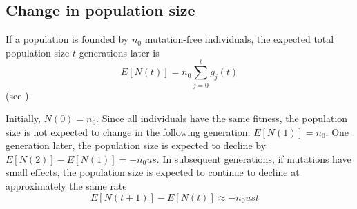\documentclass[9pt,lineno]{elife}
\begin{document}
\subsection*{Change in population size}


If a population is founded by $n_0$ mutation-free individuals, the expected total population size $t$ generations later is
%
\begin{equation}
E\left[N(t)\right] = n_0 \sum_{j=0}^t{g_{j}(t)}      
\label{eq:N} %
%
%
\end{equation}
%
(see ).
%

Initially, $N(0) = n_0$.  Since all individuals have the same fitness, the population size is not expected to change in the following generation: $E\left[N(1)\right] = n_0$.  One generation later, the population size is expected to decline by $E\left[N(2)\right] - E\left[N(1)\right] = - n_0us$.  In subsequent generations, if mutations have small effects, the population size is expected to continue to decline at approximately the same rate
%
\begin{equation}
E\left[N(t+1)\right] - E\left[N(t)\right] \approx -n_0 u s t \quad 
\label{eq:deltaN}
\end{equation}
\end{document}
